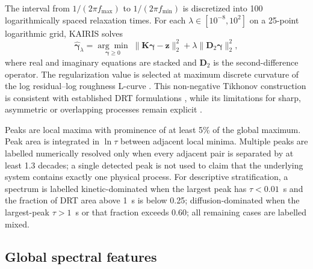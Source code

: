 \documentclass[a4paper,fleqn]{cas-sc}
\begin{document}
The interval from $1/(2\pi f_{\max})$ to $1/(2\pi f_{\min})$ is discretized into
100 logarithmically spaced relaxation times. For each
$\lambda\in[10^{-8},10^2]$ on a 25-point logarithmic grid, KAIRIS solves
\begin{equation}
 \widehat{\boldsymbol\gamma}_{\lambda}=
 \underset{\boldsymbol\gamma\geq0}{\arg\min}\;
 \|\mathbf K\boldsymbol\gamma-\mathbf z\|_2^2+
 \lambda\|\mathbf D_2\boldsymbol\gamma\|_2^2,
 \label{eq:tikhonov}
\end{equation}
where real and imaginary equations are stacked and $\mathbf D_2$ is the
second-difference operator. The regularization value is selected at maximum
discrete curvature of the log residual--log roughness L-curve
\cite{Hansen1992LCurve}. This non-negative Tikhonov construction is consistent
with established DRT formulations \cite{CiucciChen2015DRT}, while its limitations
for sharp, asymmetric or overlapping processes remain explicit
\cite{BoukampRolle2017DRT,Boukamp2025Guidance}.

Peaks are local maxima with prominence of at least 5\% of the global maximum.
Peak area is integrated in $\ln\tau$ between adjacent local minima. Multiple
peaks are labelled numerically resolved only when every adjacent pair is
separated by at least 1.3 decades; a single detected peak is not used to claim
that the underlying system contains exactly one physical process. For descriptive
stratification, a spectrum is labelled kinetic-dominated when the largest peak
has $\tau<0.01$~s and the fraction of DRT area above 1~s is below 0.25;
diffusion-dominated when the largest-peak $\tau>1$~s or that fraction exceeds
0.60; all remaining cases are labelled mixed.

\subsection{Global spectral features}\label{sec:gsf}
\end{document}
